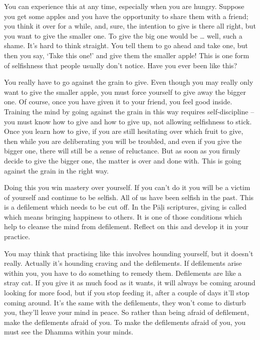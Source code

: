 You can experience this at any time, especially when you are hungry. Suppose you get some apples and you have the opportunity to share them with a friend; you think it over for a while, and, sure, the intention to give is there all right, but you want to give the smaller one. To give the big one would be \ldots{} well, such a shame. It's hard to think straight. You tell them to go ahead and take one, but then you say, `Take this one!' and give them the smaller apple! This is one form of selfishness that people usually don't notice. Have you ever been like this? 

You really have to go against the grain to give. Even though you may really only want to give the smaller apple, you must force yourself to give away the bigger one. Of course, once you have given it to your friend, you feel good inside. Training the mind by going against the grain in this way requires self-discipline -- you must know how to give and how to give up, not allowing selfishness to stick. Once you learn how to give, if you are still hesitating over which fruit to give, then while you are deliberating you will be troubled, and even if you give the bigger one, there will still be a sense of reluctance. But as soon as you firmly decide to give the bigger one, the matter is over and done with. This is going against the grain in the right way. 

Doing this you win mastery over yourself. If you can't do it you will be a victim of yourself and continue to be selfish. All of us have been selfish in the past. This is a defilement which needs to be cut off. In the P\=a\d{l}i scriptures, giving is called  which means bringing happiness to others. It is one of those conditions which help to cleanse the mind from defilement. Reflect on this and develop it in your practice. 

You may think that practising like this involves hounding yourself, but it doesn't really. Actually it's hounding craving and the defilements. If defilements arise within you, you have to do something to remedy them. Defilements are like a stray cat. If you give it as much food as it wants, it will always be coming around looking for more food, but if you stop feeding it, after a couple of days it'll stop coming around. It's the same with the defilements, they won't come to disturb you, they'll leave your mind in peace. So rather than being afraid of defilement, make the defilements afraid of you. To make the defilements afraid of you, you must see the Dhamma within your minds. 

